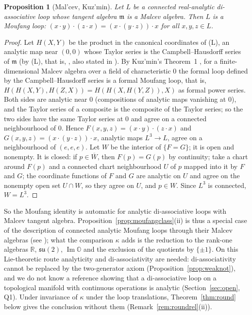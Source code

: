 \documentclass[11pt,reqno]{amsart}
\newtheorem{proposition}[theorem]{Proposition}
\theoremstyle{definition}
\theoremstyle{remark}
\numberwithin{equation}{section}
\newcommand{\R}{\mathbb{R}}
\newcommand{\su}{\mathfrak{su}}
\newcommand{\im}{\operatorname{Im}}
\begin{document}
\begin{proposition}[Mal'cev, Kuz'min]\label{prop:mfauto}
Let $L$ be a connected real-analytic di-associative loop whose tangent algebra $\mathfrak m$ is a Malcev algebra.  Then $L$
is a Moufang loop: $(x\cdot y)\cdot(z\cdot x)=(x\cdot(y\cdot z))\cdot x$ for all $x,y,z\in L$.
\end{proposition}
\begin{proof}
Let $H(X,Y)$ be the product in the canonical coordinates of (L), an analytic map near $(0,0)$ whose Taylor series is the
Campbell--Hausdorff series of $\mathfrak m$ (by (L), that is, \cite[Thm.~2]{Malcev55}, also stated in \cite[\S2]{Kuzmin71}).  By Kuz'min's Theorem~1 \cite{Kuzmin71}, for a finite-dimensional Malcev algebra over a field
of characteristic $0$ the formal loop defined by the Campbell--Hausdorff series is a formal Moufang loop, that is,
$H(H(X,Y),H(Z,X))=H(H(X,H(Y,Z)),X)$ as formal power series.  Both sides are analytic near $0$ (compositions of analytic maps
vanishing at $0$), and the Taylor series of a composite is the composite of the Taylor series; so the two sides have the same Taylor
series at $0$ and agree on a connected neighbourhood of $0$.  Hence $F(x,y,z)=(x\cdot y)\cdot(z\cdot x)$ and $G(x,y,z)=(x\cdot(y\cdot z))\cdot x$,
analytic maps $L^3\to L$, agree on a neighbourhood of $(e,e,e)$.  Let $W$ be the interior of $\{F=G\}$; it is open and nonempty.  It is
closed: if $p\in\overline W$, then $F(p)=G(p)$ by continuity; take a chart around $F(p)$ and a connected chart neighbourhood $U$ of $p$
mapped into it by $F$ and $G$; the coordinate functions of $F$ and $G$ are analytic on $U$ and agree on the nonempty open set $U\cap W$,
so they agree on $U$, and $p\in W$.  Since $L^3$ is connected, $W=L^3$.
\end{proof}

So the Moufang identity is automatic for analytic di-associative loops with Malcev tangent algebra.  Proposition~\ref{prop:moufangclass}(ii)
is thus a special case of the description of connected analytic Moufang loops through their Malcev algebras \cite{Kerdman} (see
\cite{NS02}); what the comparison $\kappa$ adds is the reduction to the rank-one algebras $\R$, $\su(2)$, $\im\mathbb O$ and the exclusion of
the quotients by $\{\pm1\}$.  On this Lie-theoretic route analyticity and di-associativity are needed: di-associativity cannot be
replaced by the two-generator axiom (Proposition~\ref{prop:weaknot}), and we do not know a reference showing that a di-associative loop on
a topological manifold with continuous operations is analytic (Section~\ref{sec:open}, Q1).  Under invariance of $\kappa$ under the loop
translations, Theorem~\ref{thm:round} below gives the conclusion without them (Remark~\ref{rem:roundrel}(ii)).
\end{document}

